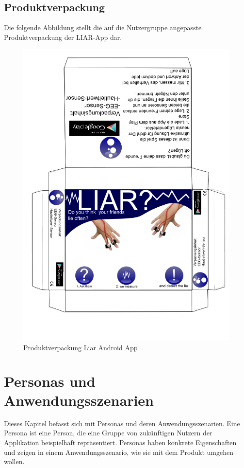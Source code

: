 \documentclass[10pt, a4paper, oneside, titlepage]{scrartcl} %
\begin{document}
   	\subsection{Produktverpackung}
   	Die folgende Abbildung stellt die auf die Nutzergruppe angepasste Produktverpackung der LIAR-App dar.
	\begin{figure}[ht!]
	\begin{center}
		\includegraphics[scale=0.5]{verpackung_bjoern.png}
	\end{center}
	\caption[Produktverpackung]{Produktverpackung Liar Android App}
	\label{fig:verpackung}
	\end{figure}   
   
   	\newpage
   	\section{Personas und Anwendungsszenarien}
   	Dieses Kapitel befasst sich mit Personas und deren Anwendungsszenarien. Eine Persona ist eine Person, die eine Gruppe von zukünftigen Nutzern der Applikation beispielhaft repräsentiert. Personas haben konkrete Eigenschaften und zeigen in einem Anwendungsszenario, wie sie mit dem Produkt umgehen wollen.
   	
\end{document}
